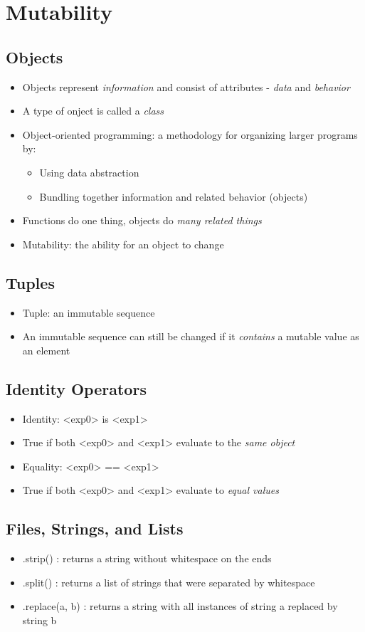\chapter{Mutability}

\section{Objects}
\begin{itemize}
    \item Objects represent \emph{information} and consist of attributes - \emph{data} and \emph{behavior}
    \item A type of onject is called a \emph{class}
    \item Object-oriented programming: a methodology for organizing larger programs by:
    \begin{itemize}
        \item Using data abstraction
        \item Bundling together information and related behavior (objects)
    \end{itemize}
    \item Functions do one thing, objects do \emph{many related things}
    \item Mutability: the ability for an object to change
\end{itemize}

\section{Tuples}
\begin{itemize}
    \item Tuple: an immutable sequence
    \item An immutable sequence can still be changed if it \emph{contains} a mutable value as an element
\end{itemize}

\section{Identity Operators}
\begin{itemize}
    \item Identity: <exp0> is <exp1>
    \item True if both <exp0> and <exp1> evaluate to the \emph{same object}
    \item Equality: <exp0> == <exp1>
    \item True if both <exp0> and <exp1> evaluate to \emph{equal values}
\end{itemize}

\section{Files, Strings, and Lists}
\begin{itemize}
    \item .strip() : returns a string without whitespace on the ends
    \item .split() : returns a list of strings that were separated by whitespace
    \item .replace(a, b) : returns a string with all instances of string a replaced by string b
\end{itemize}